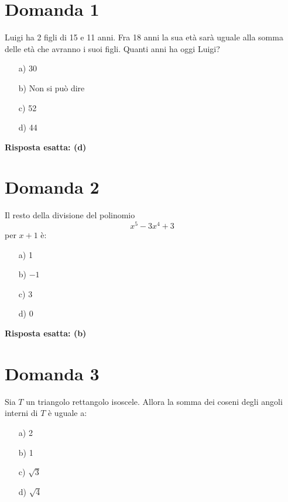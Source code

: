 \documentclass{article}
\begin{document}
\fontsize{18}{27}\selectfont

\section*{Domanda 1}

Luigi ha 2 figli di 15 e 11 anni.
Fra 18 anni la sua età sarà uguale alla somma delle età
che avranno i suoi figli.
Quanti anni ha oggi Luigi?

\begin{enumerate}
    \item[a)] 30
    \item[b)] Non si può dire
    \item[c)] 52
    \item[d)] 44
\end{enumerate}

\textbf{Risposta esatta: (d)}

\medskip

\section*{Domanda 2}

Il resto della divisione del polinomio
\[
    x^5 - 3x^4 + 3
\]
per $x + 1$ è:

\begin{enumerate}
    \item[a)] 1
    \item[b)] $-1$
    \item[c)] 3
    \item[d)] 0
\end{enumerate}

\textbf{Risposta esatta: (b)}

\medskip

\section*{Domanda 3}

Sia $T$ un triangolo rettangolo isoscele.
Allora la somma dei coseni degli angoli interni di $T$
è uguale a:

\begin{enumerate}
    \item[a)] 2
    \item[b)] 1
    \item[c)] $\sqrt{3}$
    \item[d)] $\sqrt{4}$
\end{enumerate}
\end{document}
